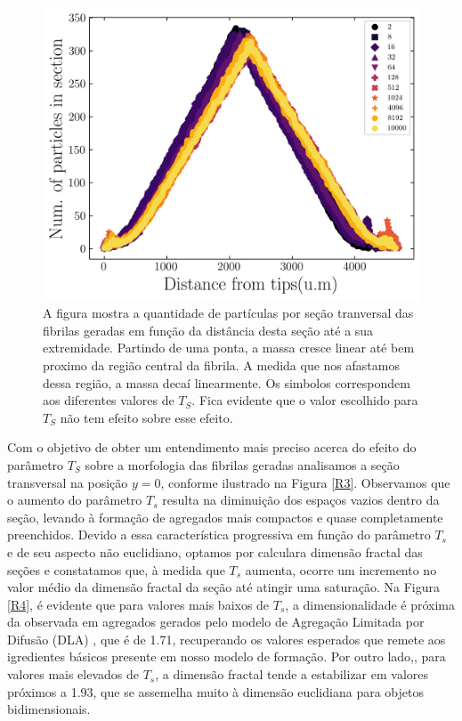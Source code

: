 \documentclass{article}
\begin{document}
    \begin{figure}[H]
        \centering
        \includegraphics[width=\textwidth]{figures/tips.png}

        \caption{A figura mostra a quantidade de partículas por seção tranversal das fibrilas geradas em função da 
        distância desta seção até a sua extremidade. Partindo de uma ponta, a massa cresce linear até bem proximo 
        da região central da fibrila. A medida que nos afastamos dessa região, a massa decaí linearmente. Os simbolos 
        correspondem aos diferentes valores de $T_{S}$. Fica evidente que o valor escolhido para $T_{S}$ não tem 
        efeito sobre esse efeito.} 

        \label{R2}
    \end{figure}


    Com o objetivo de obter um entendimento mais preciso acerca do efeito do parâmetro $T_{S}$ sobre a morfologia das 
    fibrilas geradas analisamos a seção transversal na posição \(y=0\), conforme ilustrado na Figura \ref{R3}. Observamos 
    que o aumento do parâmetro \(T_{s}\) resulta na diminuição dos espaços vazios dentro da seção, levando à formação de 
    agregados mais compactos e quase completamente preenchidos. Devido a essa característica progressiva em função do 
    parâmetro \(T_{s}\) e de seu aspecto não euclidiano, optamos por calculara dimensão fractal das seções e constatamos que, à medida que \(T_{s}\) aumenta, ocorre um 
    incremento no valor médio da dimensão fractal da seção até atingir uma saturação. Na Figura \ref{R4}, é evidente 
    que para valores mais baixos de \(T_{s}\), a dimensionalidade é próxima da observada em agregados gerados pelo 
    modelo de Agregação Limitada por Difusão (DLA) \cite{Witten1983}, que é de 1.71, recuperando os valores esperados 
    que remete aos igredientes básicos presente em nosso modelo de formação. Por outro lado,, para valores mais elevados 
    de \(T_{s}\), a dimensão fractal tende a estabilizar em valores próximos a 1.93, que se assemelha muito à dimensão 
    euclidiana para objetos bidimensionais. 
\end{document}
